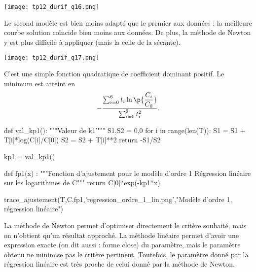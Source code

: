 \begin{center}
\texttt{[image: tp12\_durif\_q16.png]}
\end{center}


\question{}
Le second modèle est bien moins adapté que le premier aux données : la meilleure courbe solution coïncide bien moins aux données. De plus, la méthode de Newton y est plus difficile à appliquer (mais la celle de la sécante). 


\begin{center}
\texttt{[image: tp12\_durif\_q17.png]}
\end{center}


\question{}
C'est une simple fonction quadratique de coefficient dominant positif. Le minimum est atteint en 
\begin{equation*}
  -\dfrac{\sum_{i=0}^6 t_i \ln\p{\dfrac{C_i}{C_0}}}{\sum_{i=0}^6 t_i^2}.
\end{equation*}



\question{}
\begin{pyverbatim}
def val_kp1():
    """Valeur de k1'"""
    S1,S2 = 0,0
    for i in range(len(T)):
        S1 = S1 + T[i]*log(C[i]/C[0])
        S2 = S2 + T[i]**2
    return -S1/S2
    
kp1 = val_kp1()
\end{pyverbatim}

\question{}
\begin{pyverbatim}
def fp1(x) :
    """Fonction d'ajustement pour le modèle d'ordre 1
    Régression linéaire sur les logarithmes de C"""
    return  C[0]*exp(-kp1*x)


trace_ajustement(T,C,fp1,'regression_ordre_1_lin.png',"Modèle d'ordre 1, régression linéaire")
\end{pyverbatim}


\question{}
La méthode de Newton permet d'optimiser directement le critère souhaité, mais on n'obtient qu'un résultat approché. 
La méthode linéaire permet d'avoir une expression exacte (on dit aussi : forme close) du paramètre, mais le paramètre obtenu ne minimise pas le critère pertinent. 
Toutefois, le paramètre donné par la régression linéaire est très proche de celui donné par la méthode de Newton. 
